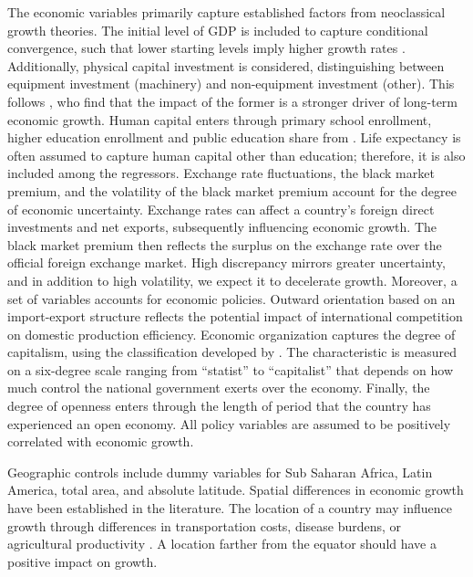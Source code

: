 \begin{refsection}
\begin{subappendices}
The economic variables primarily capture established factors from neoclassical growth theories. The initial level of GDP is included to capture conditional convergence, such that lower starting levels imply higher growth rates \parencite{BarroandMartin1992}. Additionally, physical capital investment is considered, distinguishing between equipment investment (machinery) and non-equipment investment (other). This follows \textcite{DeLongandSummers1991}, who find that the impact of the former is a stronger driver of long-term economic growth. Human capital enters through primary school enrollment, higher education enrollment and public education share from \textcite{Barro1996}. Life expectancy is often assumed to capture human capital other than education; therefore, it is also included among the regressors. Exchange rate fluctuations, the black market premium, and the volatility of the black market premium account for the degree of economic uncertainty. Exchange rates can affect a country's foreign direct investments and net exports, subsequently influencing economic growth. The black market premium then reflects the surplus on the exchange rate over the official foreign exchange market. High discrepancy mirrors greater uncertainty, and in addition to high volatility, we expect it to decelerate growth. Moreover, a set of variables accounts for economic policies. Outward orientation based on an import-export structure reflects the potential impact of international competition on domestic production efficiency. Economic organization captures the degree of capitalism, using the classification developed by \textcite{HallJones1996}. The characteristic is measured on a six-degree scale ranging from ``statist'' to ``capitalist'' that depends on how much control the national government exerts over the economy. Finally, the degree of openness enters through the length of period that the country has experienced an open economy. All policy variables are assumed to be positively correlated with economic growth.

Geographic controls include dummy variables for Sub Saharan Africa, Latin America, total area, and absolute latitude. Spatial differences in economic growth have been established in the literature. The location of a country may influence growth through differences in transportation costs, disease burdens, or agricultural productivity \parencite{Gallupandsachs1999}. A location farther from the equator should have a positive impact on growth.


\end{subappendices}
\end{refsection}
